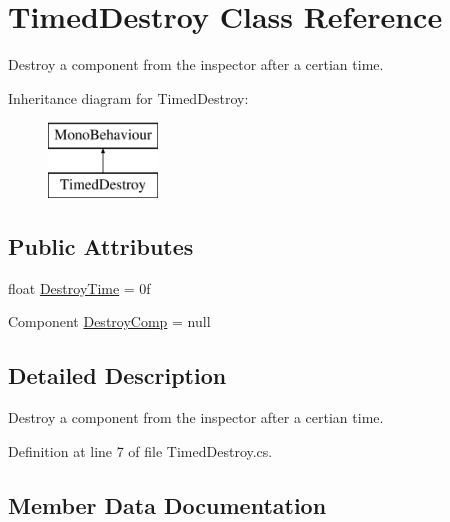 \hypertarget{class_timed_destroy}{}\section{Timed\+Destroy Class Reference}
\label{class_timed_destroy}


Destroy a component from the inspector after a certian time.  


Inheritance diagram for Timed\+Destroy\+:\begin{figure}[H]
\begin{center}
\leavevmode
\includegraphics[height=2.000000cm]{class_timed_destroy}
\end{center}
\end{figure}
\subsection*{Public Attributes}
\begin{DoxyCompactItemize}
\item 
float \mbox{\hyperlink{class_timed_destroy_aed5f630a2c47308e0932ed672f9e1ce6}{Destroy\+Time}} = 0f
\item 
Component \mbox{\hyperlink{class_timed_destroy_ab7ccdb8b9ab93cf371fa36a7c43a2db1}{Destroy\+Comp}} = null
\end{DoxyCompactItemize}


\subsection{Detailed Description}
Destroy a component from the inspector after a certian time. 



Definition at line 7 of file Timed\+Destroy.\+cs.



\subsection{Member Data Documentation}
\mbox{\label{class_timed_destroy_ab7ccdb8b9ab93cf371fa36a7c43a2db1}} 
